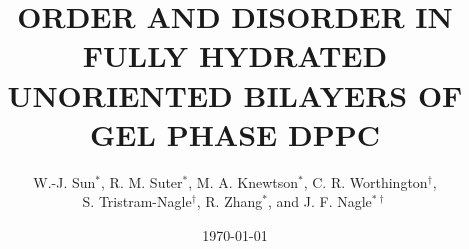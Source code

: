 

\title{ORDER AND DISORDER IN FULLY HYDRATED \protect\\
UNORIENTED BILAYERS OF GEL PHASE DPPC
}
\author{W.-J. Sun$^{*}$,  R. M. Suter$^{*}$,  M. A. 
Knewtson$^{*}$, C. R. Worthington$^{\dag}$, \protect\\
S. Tristram-Nagle$^{\dag}$, R. Zhang$^{*}$, and J. F. Nagle$^{* \dag}$}
\address{Department of Physics$^{*}$ and Biological Sciences$^{\dag}$,\protect\\
 Carnegie Mellon University , Pittsburgh, PA 15213
}
\date{\today}
\maketitle
